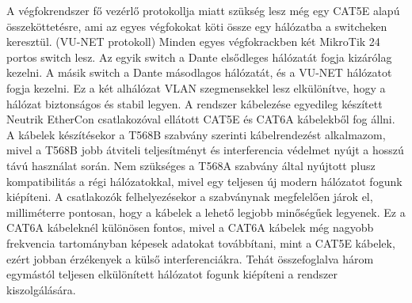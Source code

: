 A végfokrendszer fő vezérlő protokollja miatt szükség lesz még egy CAT5E alapú
összeköttetésre, ami az egyes végfokokat köti össze egy hálózatba a switcheken keresztül. (VU-NET protokoll)
Minden egyes végfokrackben két MikroTik 24 portos switch lesz. Az egyik switch a Dante elsődleges hálózatát fogja kizárólag kezelni.
A másik switch a Dante másodlagos hálózatát, és a VU-NET hálózatot fogja kezelni.
Ez a két alhálózat VLAN szegmensekkel lesz elkülönítve, hogy a hálózat biztonságos és stabil legyen.
A rendszer kábelezése egyedileg készített Neutrik EtherCon csatlakozóval ellátott CAT5E és CAT6A kábelekből fog állni.
A kábelek készítésekor a T568B szabvány szerinti kábelrendezést alkalmazom, mivel a T568B jobb átviteli
teljesítményt és interferencia védelmet nyújt a hosszú távú használat során.
Nem szükséges a T568A szabvány által nyújtott plusz kompatibilitás a régi hálózatokkal, mivel egy teljesen új 
modern hálózatot fogunk kiépíteni. 
A csatlakozók felhelyezésekor a szabványnak megfelelően járok el, milliméterre pontosan, hogy a kábelek
a lehető legjobb minőségűek legyenek. Ez a CAT6A kábeleknél különösen fontos, mivel a CAT6A kábelek
még nagyobb frekvencia tartományban képesek adatokat továbbítani, mint a CAT5E kábelek,
ezért jobban érzékenyek a külső interferenciákra.
Tehát összefoglalva három egymástól teljesen elkülönített hálózatot fogunk kiépíteni a rendszer kiszolgálására.

